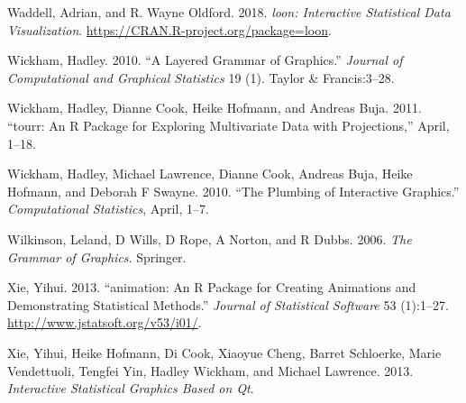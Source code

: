 \documentclass[12pt,]{article}
\theoremstyle{definition}
\theoremstyle{definition}
\theoremstyle{definition}
\theoremstyle{remark}
\begin{document}
\leavevmode\hypertarget{ref-loon}{}%
Waddell, Adrian, and R. Wayne Oldford. 2018. \emph{loon: Interactive
Statistical Data Visualization}.
\url{https://CRAN.R-project.org/package=loon}.

\leavevmode\hypertarget{ref-ggplot2-paper}{}%
Wickham, Hadley. 2010. ``A Layered Grammar of Graphics.'' \emph{Journal
of Computational and Graphical Statistics} 19 (1). Taylor \&
Francis:3--28.

\leavevmode\hypertarget{ref-tourr}{}%
Wickham, Hadley, Dianne Cook, Heike Hofmann, and Andreas Buja. 2011.
``tourr: An R Package for Exploring Multivariate Data with
Projections,'' April, 1--18.

\leavevmode\hypertarget{ref-plumbing}{}%
Wickham, Hadley, Michael Lawrence, Dianne Cook, Andreas Buja, Heike
Hofmann, and Deborah F Swayne. 2010. ``The Plumbing of Interactive
Graphics.'' \emph{Computational Statistics}, April, 1--7.

\leavevmode\hypertarget{ref-wilkinson}{}%
Wilkinson, Leland, D Wills, D Rope, A Norton, and R Dubbs. 2006.
\emph{The Grammar of Graphics}. Springer.

\leavevmode\hypertarget{ref-animation}{}%
Xie, Yihui. 2013. ``animation: An R Package for Creating Animations and
Demonstrating Statistical Methods.'' \emph{Journal of Statistical
Software} 53 (1):1--27. \url{http://www.jstatsoft.org/v53/i01/}.

\leavevmode\hypertarget{ref-cranvas}{}%
Xie, Yihui, Heike Hofmann, Di Cook, Xiaoyue Cheng, Barret Schloerke,
Marie Vendettuoli, Tengfei Yin, Hadley Wickham, and Michael Lawrence.
2013. \emph{Interactive Statistical Graphics Based on Qt}.
\end{document}
